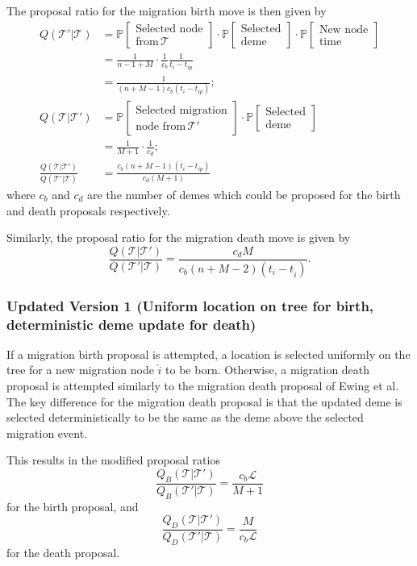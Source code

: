 \documentclass[12pt,a4paper]{article}
\newcommand{\calL}{\mathcal{L}}
\newcommand{\calT}{\mathcal{T}}
\newcommand{\bbP}{\mathbb{P}}
\begin{document}
				The proposal ratio for the migration birth move is then given by
					\begin{align*}
						Q( \calT' | \calT) & = \bbP \left[ \substack{\text{Selected node} \\ \text{from} \, \calT} \right] \cdot \bbP[\substack{\text{Selected}\\ \text{deme}}] \cdot \bbP[\substack{\text{New node} \\ \text{time}}] \\
							& = \frac{1}{n-1+M} \cdot \frac{1}{c_b} \frac{1}{t_i - t_{ip}} \\
							& = \frac{1}{(n+M-1)c_b (t_i - t_{ip})}; \\[1ex]
						Q(\calT | \calT') & = \bbP[\substack{\text{Selected migration} \\ \text{node from} \, \calT'}] \cdot \bbP[\substack{\text{Selected} \\ \text{deme}}] \\
							& = \frac{1}{M+1} \cdot \frac{1}{c_d}; \\
						\frac{Q(\calT | \calT')}{Q(\calT' | \calT)} & = \frac{c_b (n+M-1) (t_i - t_{ip})}{c_d(M+1)}
					\end{align*}
				where $c_b$ and $c_d$ are the number of demes which could be proposed for the birth and death proposals respectively.
				
				Similarly, the proposal ratio for the migration death move is given by
					\[
						\frac{Q(\calT | \calT')}{Q(\calT' | \calT)} = \frac{c_d M}{c_b (n+M - 2) (t_i -t_{\hat{i}})}.
					\]
				
		\subsubsection{Updated Version 1 (Uniform location on tree for birth, deterministic deme update for death)}
			If a migration birth proposal is attempted, a location is selected uniformly on the tree for a new migration node $\hat{i}$ to be born. Otherwise, a migration death proposal is attempted similarly to the migration death proposal of Ewing et al. The key difference for the migration death proposal is that the updated deme is selected deterministically to be the same as the deme above the selected migration event.
			
			This results in the modified proposal ratios
				\[
					\frac{Q_B(\calT | \calT')}{Q_B(\calT' | \calT)} = \frac{c_b \calL}{M+1}
				\]
			for the birth proposal, and
				\[
					\frac{Q_D(\calT | \calT')}{Q_D(\calT' | \calT)} = \frac{M}{c_b \calL}
				\]
			for the death proposal.
			
\end{document}
